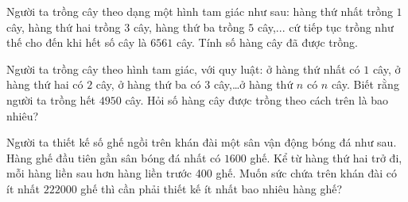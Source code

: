 \begin{ex}%
	Người ta trồng cây  theo dạng một hình tam giác như sau: hàng thứ nhất trồng $1$ cây, hàng thứ hai trồng $3$ cây, hàng thứ ba trồng $5$ cây,... cứ tiếp tục trồng như thế cho đến khi hết số cây là $6561$ cây. Tính số hàng cây đã được trồng.
\end{ex}

\begin{ex}%
	Người ta trồng cây theo hình tam giác, với quy luật: ở  hàng thứ nhất có $1$ cây, ở hàng thứ hai có $2$ cây, ở hàng thứ ba có $3$ cây,…ở hàng thứ $n$ có $ n$ cây. Biết rằng người ta trồng hết $4950$ cây. Hỏi số hàng cây được trồng theo cách trên là bao nhiêu?
\end{ex}

\begin{ex}%
	Người ta thiết kế số ghế ngồi trên khán đài một sân vận động bóng đá như sau. Hàng ghế đầu tiên gần sân bóng đá nhất có $1600$ ghế. Kể từ hàng thứ hai trở đi, mỗi hàng liền sau hơn hàng liền  trước 400 ghế. Muốn sức chứa trên khán đài có ít nhất $222000$ ghế thì cần phải thiết kế ít nhất bao nhiêu hàng ghế?
\end{ex}

